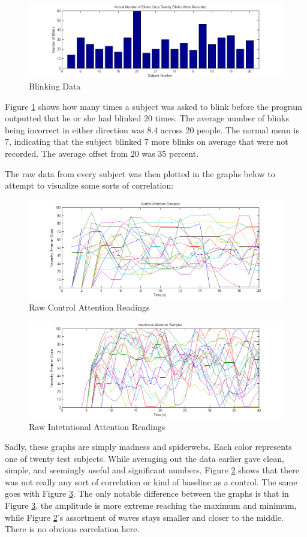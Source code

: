 \documentclass[journal]{IEEEtran}
\begin{document}
\begin{figure}[H]
    \centering
    \includegraphics[width=.5\textwidth]{EEG/Actual_blinks_graph}
    \caption{Blinking Data}
    \label{blinking}
\end{figure} 

Figure \ref{blinking} shows how many times a subject was asked to blink before the program outputted that he or she had blinked 20 times. The average number of blinks being incorrect in either direction was 8.4 across 20 people. The normal mean is 7, indicating that the subject blinked 7 more blinks on average that were not recorded. The average offset from 20 was 35 percent. \par

The raw data from every subject was then plotted in the graphs below to attempt to visualize some sorts of correlation: \par

\begin{figure}[H]
    \centering
    \includegraphics[width=.5\textwidth]{EEG/all_attentions_control}
    \caption{Raw Control Attention Readings}
    \label{a_a_c}
\end{figure} 

\begin{figure}[H]
    \centering
    \includegraphics[width=.5\textwidth]{EEG/all_attentions_intentional}
    \caption{Raw Intetntional Attention Readings}
    \label{a_a_i}
\end{figure} 


Sadly, these graphs are simply madness and spiderwebs. Each color represents one of twenty test subjects. While averaging out the data earlier gave clean, simple, and seemingly useful and significant numbers, Figure \ref{a_a_c} shows that there was not really any sort of correlation or kind of baseline as a control. The same goes with Figure \ref{a_a_i}. The only notable difference between the graphs is that in Figure \ref{a_a_i}, the amplitude is more extreme reaching the maximum and minimum, while Figure \ref{a_a_c}'s assortment of waves stays smaller and closer to the middle. There is no obvious correlation here. \par
\end{document}
